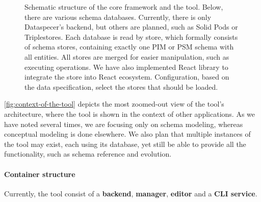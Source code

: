 {\begin{figure}
    \caption{Schematic structure of the core framework and the tool. Below, there are various schema databases. Currently, there is only Dataspecer's backend, but others are planned, such as Solid Pods or Triplestores. Each database is read by store, which formally consists of schema stores, containing exactly one PIM or PSM schema with all entities. All stores are merged for easier manipulation, such as executing operations. We have also implemented React library to integrate the store into React ecosystem. Configuration, based on the data specification, select the stores that should be loaded.  } \label{fig:schematic}
\end{figure}
\clearpage
}

\bigskip

\autoref{fig:context-of-the-tool} depicts the most zoomed-out view of the tool's architecture, where the tool is shown in the context of other applications. As we have noted several times, we are focusing only on schema modeling, whereas conceptual modeling is done elsewhere. We also plan that multiple instances of the tool may exist, each using its database, yet still be able to provide all the functionality, such as schema reference and evolution.

\paragraph{Container structure}Currently, the tool consist of a \textbf{backend}, \textbf{manager}, \textbf{editor} and a \textbf{CLI service}.

